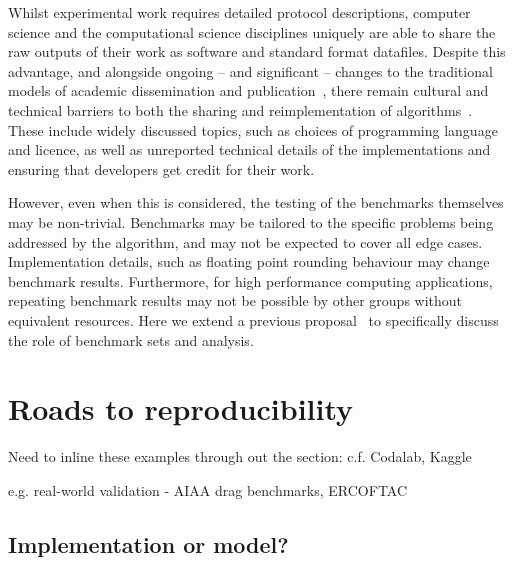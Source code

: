 \documentclass[conference]{IEEEtran}
\begin{document}
Whilst experimental work requires detailed protocol descriptions,
computer science and the computational science disciplines uniquely
are able to share the raw outputs of their work as software and
standard format datafiles. Despite this advantage, and alongside
ongoing -- and significant -- changes to the traditional models of
academic dissemination and
publication~\cite{deroure:2010,stodden-et-al:2013,fursin+dubach:2014},
there remain cultural and technical barriers to both the sharing and
reimplementation of algorithms~\cite{crick-et-al_wssspe2}. These
include widely discussed topics, such as choices of programming
language and licence, as well as unreported technical details of the
implementations and ensuring that developers get credit for their
work.


However, even when this is considered, the testing of the benchmarks
themselves may be non-trivial. Benchmarks may be tailored to the 
specific problems being addressed by the algorithm, and may not be 
expected to cover all edge cases. Implementation details, such as 
floating point rounding behaviour may change benchmark results.
Furthermore, for high performance computing applications, repeating
benchmark results may not be possible by other groups without equivalent
resources. Here we extend a previous proposal~\cite{crick-et-al_wssspe2}
to specifically discuss the role of benchmark sets and analysis.



\section{Roads to reproducibility}


Need to inline these examples through out the section: 
	c.f. Codalab, Kaggle

	e.g. real-world validation - AIAA drag benchmarks, ERCOFTAC


\subsection{Implementation or model?}
\end{document}
